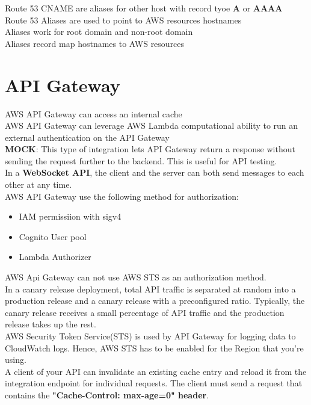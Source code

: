\documentclass[12pt, letterpaper, twoside]{article}
\begin{document}
Route 53 CNAME are aliases for other host with record tyoe \textbf{A} or \textbf{AAAA}\\
Route 53 Aliases are used to point to AWS resources hostnames\\
Aliases work for root domain and non-root domain\\
Aliases record map hostnames to AWS resources\\

\section{API Gateway}
AWS API Gateway can access an internal cache\\
AWS API Gateway can leverage AWS Lambda computational ability to run an external  authentication
on the API Gateway\\

\textbf{MOCK}: This type of integration lets API Gateway return a response without sending the request further 
to the backend. This is useful for API testing.\\

In a \textbf{WebSocket API}, the client and the server can both send messages to each other at any time.\\

AWS API Gateway use the following method for authorization:
\begin{itemize}
	\item IAM permissiion with sigv4
	\item Cognito User pool
 	\item Lambda Authorizer
\end{itemize}
AWS Api Gateway can not use AWS STS as an authorization method.\\

In a canary release deployment, total API traffic is separated at random into a production release and a canary 
release with a preconfigured ratio. Typically, the canary release receives a small percentage of API traffic and 
the production release takes up the rest.\\

AWS Security Token Service(STS) is used by API Gateway for logging data to CloudWatch logs. 
Hence, AWS STS has to be enabled for the Region that you're using.\\

A client of your API can invalidate an existing cache entry and reload it from the integration endpoint for individual requests. 
The client must send a request that contains the \textbf{"Cache-Control: max-age=0" header}.\\ 
\end{document}
